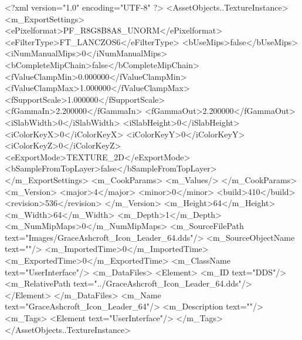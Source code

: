 <?xml version="1.0" encoding="UTF-8" ?>
<AssetObjects..TextureInstance>
	<m_ExportSettings>
		<ePixelformat>PF_R8G8B8A8_UNORM</ePixelformat>
		<eFilterType>FT_LANCZOS6</eFilterType>
		<bUseMips>false</bUseMips>
		<iNumManualMips>0</iNumManualMips>
		<bCompleteMipChain>false</bCompleteMipChain>
		<fValueClampMin>0.000000</fValueClampMin>
		<fValueClampMax>1.000000</fValueClampMax>
		<fSupportScale>1.000000</fSupportScale>
		<fGammaIn>2.200000</fGammaIn>
		<fGammaOut>2.200000</fGammaOut>
		<iSlabWidth>0</iSlabWidth>
		<iSlabHeight>0</iSlabHeight>
		<iColorKeyX>0</iColorKeyX>
		<iColorKeyY>0</iColorKeyY>
		<iColorKeyZ>0</iColorKeyZ>
		<eExportMode>TEXTURE_2D</eExportMode>
		<bSampleFromTopLayer>false</bSampleFromTopLayer>
	</m_ExportSettings>
	<m_CookParams>
		<m_Values/>
	</m_CookParams>
	<m_Version>
		<major>4</major>
		<minor>0</minor>
		<build>410</build>
		<revision>536</revision>
	</m_Version>
	<m_Height>64</m_Height>
	<m_Width>64</m_Width>
	<m_Depth>1</m_Depth>
	<m_NumMipMaps>0</m_NumMipMaps>
	<m_SourceFilePath text="Images/GraceAshcroft_Icon_Leader_64.dds"/>
	<m_SourceObjectName text=""/>
	<m_ImportedTime>0</m_ImportedTime>
	<m_ExportedTime>0</m_ExportedTime>
	<m_ClassName text="UserInterface"/>
	<m_DataFiles>
		<Element>
			<m_ID text="DDS"/>
			<m_RelativePath text="../GraceAshcroft_Icon_Leader_64.dds"/>
		</Element>
	</m_DataFiles>
	<m_Name text="GraceAshcroft_Icon_Leader_64"/>
	<m_Description text=""/>
	<m_Tags>
		<Element text="UserInterface"/>
	</m_Tags>
</AssetObjects..TextureInstance>
